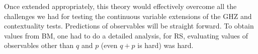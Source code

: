 Once extended appropriately, this theory would effectively overcome
all the challenges we had for testing the continuous variable extensions
of the GHZ and contextuality tests. Predictions of observables will
be straight forward. To obtain values from BM, one had to do a detailed
analysis, for RS, evaluating values of observables other than $q$
and $p$ (even $q+p$ is hard) was hard.

